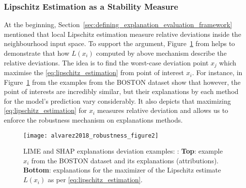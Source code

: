 \documentclass[english]{tktltiki2}
\theoremstyle{definition}
\theoremstyle{remark}
\begin{document}
\subsubsection{Lipschitz Estimation as a Stability Measure}\label{sec:lipschitz_estimation_as_a_stabilitys_measure} %
At the beginning, Section~\ref{sec:defining_explanation_evaluation_framework} mentioned that local Lipschitz estimation measure relative deviations inside the neighbourhood input space. To support the argument, Figure~\ref{fig:alvarez2018_robustness_figure2} from \citep{alvarez2018robustness} helps to demonstrate that how $L(x_i)$ computed by above mechanism describe the relative deviations. The idea is to find the worst-case deviation point $x_j$ which maximise the \eqref{eq:lipschitz_estimation} from point of interest $x_i$. For instance, in Figure~\ref{fig:alvarez2018_robustness_figure2} from \citep{alvarez2018robustness} the examples from the BOSTON dataset show that however, the point of interests are incredibly similar, but their explanations by each method for the model’s prediction vary considerably. It also depicts that maximizing \eqref{eq:lipschitz_estimation} for $x_i$ measures relative deviation and allows us to enforce the robustness mechanism on explanations methods.
\begin{figure}[H]
	\texttt{[image: alvarez2018\_robustness\_figure2]}
	\vspace*{-10mm}
	\caption{LIME and SHAP explanations deviation examples: \citep{alvarez2018robustness}: \textbf{Top}: example $x_i$ from the BOSTON dataset and its explanations (attributions). \textbf{Bottom}: explanations for the maximizer of the Lipschitz estimate $L(x_i)$ as per \eqref{eq:lipschitz_estimation}.}
	\label{fig:alvarez2018_robustness_figure2}
\end{figure}

%
%
\end{document}
